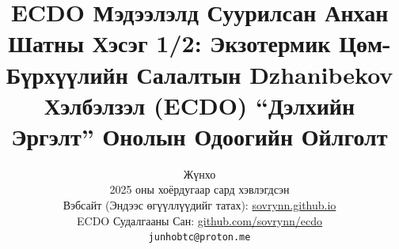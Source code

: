 \documentclass[10pt,twocolumn,letterpaper]{article}
\begin{document}
\title{ECDO Мэдээлэлд Суурилсан Анхан Шатны Хэсэг 1/2: Экзотермик Цөм-Бүрхүүлийн Салалтын Dzhanibekov Хэлбэлзэл (ECDO) “Дэлхийн Эргэлт” Онолын Одоогийн Ойлголт}

\author{Жүнхо\\
2025 оны хоёрдугаар сард хэвлэгдсэн\\
Вэбсайт (Эндээс өгүүллүүдийг татах): \href{https://sovrynn.github.io}{sovrynn.github.io}\\
ECDO Судалгааны Сан: \href{https://github.com/sovrynn/ecdo}{github.com/sovrynn/ecdo}\\
{\tt\small junhobtc@proton.me}
}

\maketitle
\end{document}
